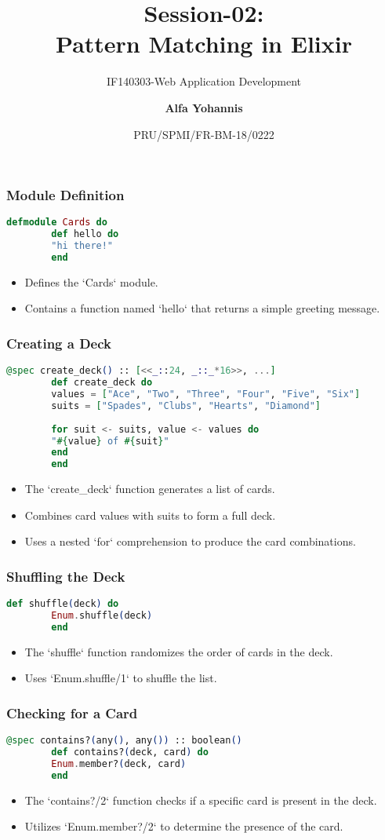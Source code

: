 \documentclass[aspectratio=169, table]{beamer}
\subtitle{IF140303-Web Application Development}
\title{\LARGE{Session-02:\\Pattern Matching in Elixir}
	\vspace{20pt}}
\date[Serial]{\scriptsize {PRU/SPMI/FR-BM-18/0222}}
\author[Pradita]{\small{\textbf{Alfa Yohannis}}}
\begin{document}
	
	\frame{\titlepage}
	
\begin{frame}[fragile]
	\frametitle{Module Definition}
	\begin{lstlisting}[language=Elixir]
		defmodule Cards do
		def hello do
		"hi there!"
		end
	\end{lstlisting}
	\begin{itemize}
		\item Defines the `Cards` module.
		\item Contains a function named `hello` that returns a simple greeting message.
	\end{itemize}
\end{frame}

\begin{frame}[fragile]
	\frametitle{Creating a Deck}
	\begin{lstlisting}[language=Elixir]
		@spec create_deck() :: [<<_::24, _::_*16>>, ...]
		def create_deck do
		values = ["Ace", "Two", "Three", "Four", "Five", "Six"]
		suits = ["Spades", "Clubs", "Hearts", "Diamond"]
		
		for suit <- suits, value <- values do
		"#{value} of #{suit}"
		end
		end
	\end{lstlisting}
	\begin{itemize}
		\item The `create\_deck` function generates a list of cards.
		\item Combines card values with suits to form a full deck.
		\item Uses a nested `for` comprehension to produce the card combinations.
	\end{itemize}
\end{frame}

\begin{frame}[fragile]
	\frametitle{Shuffling the Deck}
	\begin{lstlisting}[language=Elixir]
		def shuffle(deck) do
		Enum.shuffle(deck)
		end
	\end{lstlisting}
	\begin{itemize}
		\item The `shuffle` function randomizes the order of cards in the deck.
		\item Uses `Enum.shuffle/1` to shuffle the list.
	\end{itemize}
\end{frame}

\begin{frame}[fragile]
	\frametitle{Checking for a Card}
	\begin{lstlisting}[language=Elixir]
		@spec contains?(any(), any()) :: boolean()
		def contains?(deck, card) do
		Enum.member?(deck, card)
		end
	\end{lstlisting}
	\begin{itemize}
		\item The `contains?/2` function checks if a specific card is present in the deck.
		\item Utilizes `Enum.member?/2` to determine the presence of the card.
	\end{itemize}
\end{frame}
\end{document}
